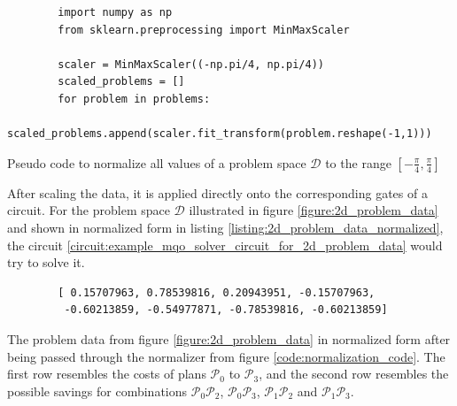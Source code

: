 \begin{listing}[!ht]
    \centering
    \begin{verbatim}
        import numpy as np
        from sklearn.preprocessing import MinMaxScaler
        
        scaler = MinMaxScaler((-np.pi/4, np.pi/4))
        scaled_problems = []
        for problem in problems:
            scaled_problems.append(scaler.fit_transform(problem.reshape(-1,1)))
    \end{verbatim}
    \caption{Pseudo code to normalize all values of a problem space $\mathcal{D}$ to the range $\left[-\frac{\pi}{4},\frac{\pi}{4}\right]$}
    \label{code:normalization_code}
\end{listing}

After scaling the data, it is applied directly onto the corresponding gates of a circuit. For the problem space $\mathcal{D}$ illustrated in figure \ref{figure:2d_problem_data} and shown in normalized form in listing \ref{listing:2d_problem_data_normalized}, the circuit \ref{circuit:example_mqo_solver_circuit_for_2d_problem_data} would try to solve it.

\begin{listing}[!ht]
    \centering
    \begin{verbatim}
        [ 0.15707963, 0.78539816, 0.20943951, -0.15707963,
         -0.60213859, -0.54977871, -0.78539816, -0.60213859]
    \end{verbatim}
    \caption{The problem data from figure \ref{figure:2d_problem_data} in normalized form after being passed through the normalizer from figure \ref{code:normalization_code}. The first row resembles the costs of plans $\mathcal{P}_0$ to $\mathcal{P}_3$, and the second row resembles the possible savings for combinations $\mathcal{P}_0\mathcal{P}_2$, $\mathcal{P}_0\mathcal{P}_3$, $\mathcal{P}_1\mathcal{P}_2$ and $\mathcal{P}_1\mathcal{P}_3$.}
    \label{listing:2d_problem_data_normalized}
\end{listing}

